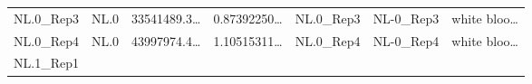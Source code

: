 \documentclass[
]{article}
\begin{document}
\begin{longtable}[]{@{}lllllll@{}}
\begin{minipage}[t]{0.12\columnwidth}\raggedright
NL.0\_Rep3\strut
\end{minipage} & \begin{minipage}[t]{0.07\columnwidth}\raggedright
NL.0\strut
\end{minipage} & \begin{minipage}[t]{0.13\columnwidth}\raggedright
33541489.3\ldots{}\strut
\end{minipage} & \begin{minipage}[t]{0.13\columnwidth}\raggedright
0.87392250\ldots{}\strut
\end{minipage} & \begin{minipage}[t]{0.12\columnwidth}\raggedright
NL.0\_Rep3\strut
\end{minipage} & \begin{minipage}[t]{0.12\columnwidth}\raggedright
NL-0\_Rep3\strut
\end{minipage} & \begin{minipage}[t]{0.13\columnwidth}\raggedright
white bloo\ldots{}\strut
\end{minipage}\tabularnewline
\begin{minipage}[t]{0.12\columnwidth}\raggedright
NL.0\_Rep4\strut
\end{minipage} & \begin{minipage}[t]{0.07\columnwidth}\raggedright
NL.0\strut
\end{minipage} & \begin{minipage}[t]{0.13\columnwidth}\raggedright
43997974.4\ldots{}\strut
\end{minipage} & \begin{minipage}[t]{0.13\columnwidth}\raggedright
1.10515311\ldots{}\strut
\end{minipage} & \begin{minipage}[t]{0.12\columnwidth}\raggedright
NL.0\_Rep4\strut
\end{minipage} & \begin{minipage}[t]{0.12\columnwidth}\raggedright
NL-0\_Rep4\strut
\end{minipage} & \begin{minipage}[t]{0.13\columnwidth}\raggedright
white bloo\ldots{}\strut
\end{minipage}\tabularnewline
\begin{minipage}[t]{0.12\columnwidth}\raggedright
NL.1\_Rep1\strut
\end{minipage} & \begin{minipage}[t]{0.07\columnwidth}\raggedright

\end{minipage}
\end{longtable}
\end{document}
